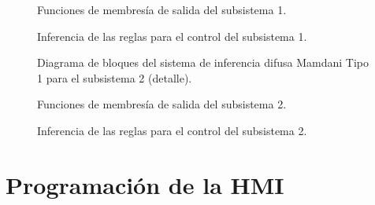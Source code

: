 \documentclass[11pt,tesis,twoside,openright,spanish]{upiiztt}
\begin{document}
\begin{figure}[H]
  \centering
  \caption{Funciones de membresía de salida del subsistema 1.}
  \label{fig:membresia_salida1}
\end{figure}

\begin{figure}[H]
  \centering
  \caption{Inferencia de las reglas para el control del subsistema 1.}
  \label{fig:inferencia_sub1}
\end{figure}

\begin{figure}[H]
  \centering
  \caption{Diagrama de bloques del sistema de inferencia difusa Mamdani Tipo 1 para el subsistema 2 (detalle).}
  \label{fig:mamdani_sub2b}
\end{figure}

\begin{figure}[H]
  \centering
  \caption{Funciones de membresía de salida del subsistema 2.}
  \label{fig:membresia_salida2}
\end{figure}

\begin{figure}[H]
  \centering
  \caption{Inferencia de las reglas para el control del subsistema 2.}
  \label{fig:inferencia_sub2}
\end{figure}
\chapter{Programación de la HMI}
\label{ap:programacion}
\end{document}
